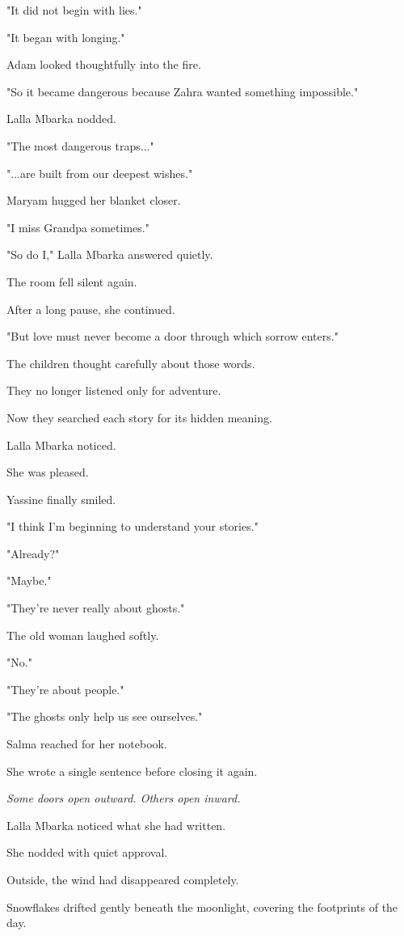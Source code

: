 \documentclass[12pt,openany]{book}
\begin{document}
"It did not begin with lies."

"It began with longing."

Adam looked thoughtfully into the fire.

"So it became dangerous because Zahra wanted something impossible."

Lalla Mbarka nodded.

"The most dangerous traps..."

"...are built from our deepest wishes."

Maryam hugged her blanket closer.

"I miss Grandpa sometimes."

"So do I," Lalla Mbarka answered quietly.

The room fell silent again.

After a long pause, she continued.

"But love must never become a door through which sorrow enters."

The children thought carefully about those words.

They no longer listened only for adventure.

Now they searched each story for its hidden meaning.

Lalla Mbarka noticed.

She was pleased.

Yassine finally smiled.

"I think I'm beginning to understand your stories."

"Already?"

"Maybe."

"They're never really about ghosts."

The old woman laughed softly.

"No."

"They're about people."

"The ghosts only help us see ourselves."

Salma reached for her notebook.

She wrote a single sentence before closing it again.

\emph{Some doors open outward. Others open inward.}

Lalla Mbarka noticed what she had written.

She nodded with quiet approval.

Outside, the wind had disappeared completely.

Snowflakes drifted gently beneath the moonlight, covering the footprints of the day.
\end{document}
